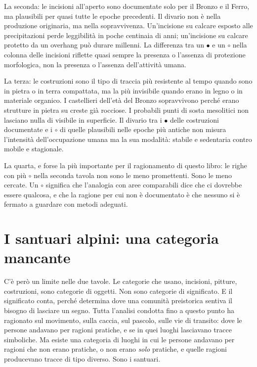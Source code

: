 La seconda: le incisioni all'aperto sono documentate solo per il Bronzo e il Ferro, ma plausibili per quasi tutte le epoche precedenti. Il divario non è nella produzione originaria, ma nella sopravvivenza. Un'incisione su calcare esposto alle precipitazioni perde leggibilità in poche centinaia di anni; un'incisione su calcare protetto da un overhang può durare millenni. La differenza tra un $\bullet$ e un $\circ$ nella colonna delle incisioni riflette quasi sempre la presenza o l'assenza di protezione morfologica, non la presenza o l'assenza dell'attività umana.

La terza: le costruzioni sono il tipo di traccia più resistente al tempo quando sono in pietra o in terra compattata, ma la più invisibile quando erano in legno o in materiale organico. I castellieri dell'età del Bronzo sopravvivono perché erano strutture in pietra su creste già rocciose. I probabili punti di sosta mesolitici non lasciano nulla di visibile in superficie. Il divario tra i $\bullet$ delle costruzioni documentate e i $\circ$ di quelle plausibili nelle epoche più antiche non misura l'intensità dell'occupazione umana ma la sua modalità: stabile e sedentaria contro mobile e stagionale.

La quarta, e forse la più importante per il ragionamento di questo libro: le righe con più $\circ$ nella seconda tavola non sono le meno promettenti. Sono le meno cercate. Un $\circ$ significa che l'analogia con aree comparabili dice che ci dovrebbe essere qualcosa, e che la ragione per cui non è documentato è che nessuno si è fermato a guardare con metodi adeguati.

\section{I santuari alpini: una categoria mancante}

C'è però un limite nelle due tavole. Le categorie che usano, incisioni, pitture, costruzioni, sono categorie di oggetti. Non sono categorie di significato. E il significato conta, perché determina dove una comunità preistorica sentiva il bisogno di lasciare un segno. Tutta l'analisi condotta fino a questo punto ha ragionato sul movimento, sulla caccia, sul pascolo, sulle vie di transito: dove le persone andavano per ragioni pratiche, e se in quei luoghi lasciavano tracce simboliche. Ma esiste una categoria di luoghi in cui le persone andavano per ragioni che non erano pratiche, o non erano \emph{solo} pratiche, e quelle ragioni producevano tracce di tipo diverso. Sono i santuari.

